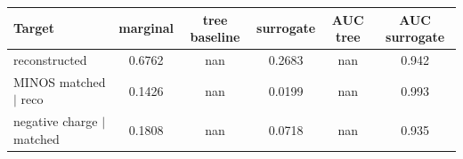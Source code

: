 \begin{tabular}{lccccc}
\toprule
Target & marginal & tree baseline & surrogate & AUC tree & AUC surrogate \\
\midrule
reconstructed & 0.6762 & nan & 0.2683 & nan & 0.942 \\
MINOS matched $\mid$ reco & 0.1426 & nan & 0.0199 & nan & 0.993 \\
negative charge $\mid$ matched & 0.1808 & nan & 0.0718 & nan & 0.935 \\
\bottomrule
\end{tabular}
